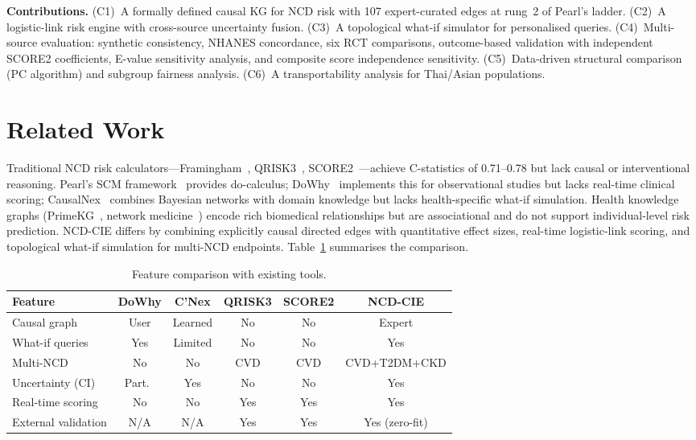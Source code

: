 \documentclass[runningheads]{llncs}
\begin{document}
\noindent\textbf{Contributions.}
(C1)~A formally defined causal KG for NCD risk with 107
expert-curated edges at rung~2 of Pearl's ladder.
(C2)~A logistic-link risk engine with cross-source uncertainty fusion.
(C3)~A topological what-if simulator for personalised queries.
(C4)~Multi-source evaluation: synthetic consistency, NHANES
concordance, six RCT comparisons, outcome-based validation
with independent SCORE2 coefficients, E-value sensitivity analysis,
and composite score independence sensitivity.
(C5)~Data-driven structural comparison (PC algorithm) and
subgroup fairness analysis.
(C6)~A transportability analysis for Thai/Asian populations.

\section{Related Work}\label{sec:related}

Traditional NCD risk calculators---Framingham~\cite{dagostino2008},
QRISK3~\cite{hippisley2017qrisk3}, SCORE2~\cite{score22021}---achieve
C-statistics of 0.71--0.78 but lack causal or interventional reasoning.
Pearl's SCM framework~\cite{pearl2009causality} provides do-calculus;
DoWhy~\cite{sharma2020dowhy} implements this for observational studies
but lacks real-time clinical scoring;
CausalNex~\cite{beaumont2021causalnex} combines Bayesian networks
with domain knowledge but lacks health-specific what-if simulation.
Health knowledge graphs (PrimeKG~\cite{chandak2023primekg},
network medicine~\cite{barabasi2011network}) encode rich biomedical
relationships but are associational and do not support
individual-level risk prediction.
NCD-CIE differs by combining explicitly causal directed edges
with quantitative effect sizes, real-time logistic-link scoring,
and topological what-if simulation for multi-NCD endpoints.
Table~\ref{tab:toolcomp} summarises the comparison.

\renewcommand{\arraystretch}{1.1}
\begin{table}[t]
\centering
\caption{Feature comparison with existing tools.}\label{tab:toolcomp}
\small
\begin{tabular}{@{}lccccc@{}}
\toprule
\textbf{Feature} & \textbf{DoWhy} & \textbf{C'Nex} &
\textbf{QRISK3} & \textbf{SCORE2} & \textbf{NCD-CIE} \\
\midrule
Causal graph        & User & Learned & No  & No  & Expert \\
What-if queries     & Yes & Limited & No  & No  & Yes \\
Multi-NCD           & No  & No      & CVD & CVD & CVD+T2DM+CKD \\
Uncertainty (CI)    & Part.\ & Yes & No  & No  & Yes \\
Real-time scoring   & No  & No      & Yes & Yes & Yes \\
External validation & N/A & N/A     & Yes & Yes & Yes (zero-fit) \\
\bottomrule
\end{tabular}
\end{table}
\renewcommand{\arraystretch}{1.0}
\end{document}
